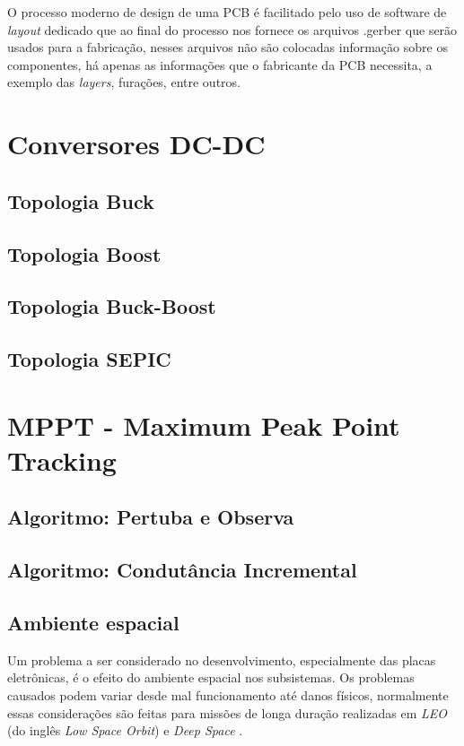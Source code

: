 O processo moderno de design de uma PCB é facilitado pelo uso de software de \textit{layout} dedicado que ao final do processo nos fornece os arquivos .gerber que serão usados para a fabricação, nesses arquivos não são colocadas informação sobre os componentes, há apenas as informações que o fabricante da PCB necessita, a exemplo das \textit{layers}, furações, entre outros.

\section{Conversores DC-DC}\label{converters_revision}
\subsection{Topologia Buck}
\subsection{Topologia Boost}
\subsection{Topologia Buck-Boost}
\subsection{Topologia SEPIC}

\section{MPPT - Maximum Peak Point Tracking}\label{mppt_revision}
\subsection{Algoritmo: Pertuba e Observa}
\subsection{Algoritmo: Condutância Incremental}

\subsection{Ambiente espacial}
Um problema a ser considerado no desenvolvimento, especialmente das placas eletrônicas, é o efeito do ambiente espacial nos subsistemas. Os problemas causados podem variar desde mal funcionamento até danos físicos, normalmente essas considerações são feitas para missões de longa duração realizadas em \textit{LEO} (do inglês \textit{Low Space Orbit}) e \textit{Deep Space} \cite{nasa_state_of_art}.

